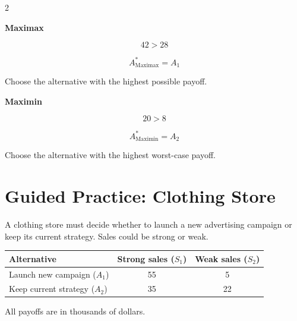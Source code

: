 	\begin{multicols}{2}
		
		\textbf{Maximax}
		
		\[
		42>28
		\]
		
		\[
		\boxed{
			A^*_{\mathrm{Maximax}}=A_1
		}
		\]
		
		Choose the alternative with the highest possible payoff.
		
		\columnbreak
		
		\textbf{Maximin}
		
		\[
		20>8
		\]
		
		\[
		\boxed{
			A^*_{\mathrm{Maximin}}=A_2
		}
		\]
		
		Choose the alternative with the highest worst-case payoff.
		
	\end{multicols}
	
	
	\section{Guided Practice: Clothing Store}
	
	A clothing store must decide whether to launch a new advertising campaign
	or keep its current strategy. Sales could be strong or weak.
	
	\begin{center}
		\renewcommand{\arraystretch}{1.3}
		\begin{tabular}{lcc}
			\toprule
			Alternative & Strong sales ($S_1$) & Weak sales ($S_2$) \\
			\midrule
			Launch new campaign ($A_1$) & 55 & 5 \\
			Keep current strategy ($A_2$) & 35 & 22 \\
			\bottomrule
		\end{tabular}
	\end{center}
	
	All payoffs are in thousands of dollars.
	

